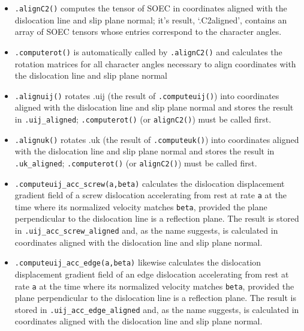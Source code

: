 \documentclass[11pt,letterpaper,oneside,pdftex]{article}
\begin{document}
\begin{itemize}
\item \verb|.alignC2()| computes the tensor of SOEC in coordinates aligned with the dislocation line and slip plane normal; it’s result, ‘.C2aligned’, contains an array of SOEC tensors whose entries correspond to the character angles.

\item \verb|.computerot()| is automatically called by \verb|.alignC2()| and calculates the rotation matrices for all character angles necessary to align coordinates with the dislocation line and slip plane normal

\item \verb|.alignuij()| rotates .uij (the result of \verb|.computeuij()|) into coordinates aligned with the dislocation line and slip plane normal and stores the result in \verb|.uij_aligned|; \verb|.computerot()| (or \verb|alignC2()|) must be called first.

\item \verb|.alignuk()| rotates .uk (the result of \verb|.computeuk()|) into coordinates aligned with the dislocation line and slip plane normal and stores the result in \verb|.uk_aligned|; \verb|.computerot()| (or \verb|alignC2()|) must be called first.

\item \verb|.computeuij_acc_screw(a,beta)| calculates the dislocation displacement gradient field of a screw dislocation accelerating from rest at rate \verb|a| at the time where its normalized velocity matches \verb|beta|, provided the plane perpendicular to the dislocation line is a reflection plane.
The result is stored in \verb|.uij_acc_screw_aligned| and, as the name suggests, is calculated in coordinates aligned with the dislocation line and slip plane normal.

\item \verb|.computeuij_acc_edge(a,beta)| likewise calculates the dislocation displacement gradient field of an edge dislocation accelerating from rest at rate \verb|a| at the time where its normalized velocity matches \verb|beta|, provided the plane perpendicular to the dislocation line is a reflection plane.
The result is stored in \verb|.uij_acc_edge_aligned| and, as the name suggests, is calculated in coordinates aligned with the dislocation line and slip plane normal.


\end{itemize}
\end{document}
